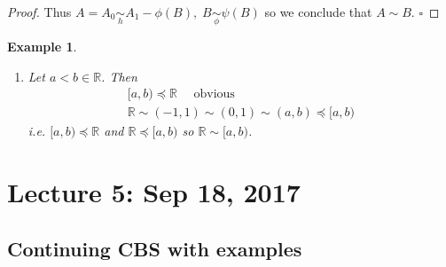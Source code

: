 \documentclass[11pt, oneside]{book}
\theoremstyle{break}
\newtheorem*{proof}{Proof}
\newtheorem{eg}{Example}[section]
\newcommand{\bb}[1]{\mathbb{#1}}			%
\newcommand{\qed}{\hfill\ensuremath{\square}}	%
\begin{document}
\begin{proof}
	Thus $A = A_0 \underset{h}{\sim} A_1 - \phi(B), \; B \underset{\phi}{\sim} \psi(B)$ so we conclude that $A \sim B$. \qed
\end{proof}

\begin{eg}
	\begin{enumerate}
		\item Let $a < b \in \bb{R}$. Then
			\begin{gather*}
				[a, b) \preceq \bb{R} \quad \text{ obvious} \\
				\bb{R} \sim (-1, 1) \sim (0, 1) \sim (a, b) \preceq [a, b)
			\end{gather*}
			i.e. $[a, b) \preceq \bb{R}$ and $\bb{R} \preceq [a, b)$ so $\bb{R} \sim [a, b)$.
	\end{enumerate}
\end{eg}

\chapter{Lecture 5: Sep 18, 2017}\label{chp:lec5}

\section{Continuing CBS with examples}\label{sect:CBS_egs}
\end{document}
